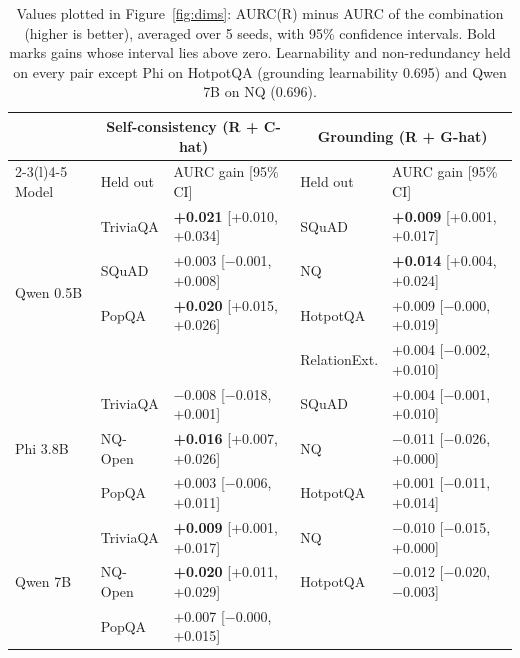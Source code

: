 \documentclass[10pt]{article}
\begin{document}
\begin{table}[h]
\centering
\small
\begin{tabular}{@{}lllll@{}}
\toprule
 & \multicolumn{2}{c}{Self-consistency (R + C-hat)} & \multicolumn{2}{c}{Grounding (R + G-hat)} \\
\cmidrule(lr){2-3}\cmidrule(l){4-5}
Model & Held out & AURC gain [95\% CI] & Held out & AURC gain [95\% CI] \\
\midrule
\multirow{4}{*}{Qwen 0.5B} & TriviaQA & \textbf{+0.021} [+0.010, +0.034] & SQuAD & \textbf{+0.009} [+0.001, +0.017] \\
 & SQuAD & +0.003 [$-$0.001, +0.008] & NQ & \textbf{+0.014} [+0.004, +0.024] \\
 & PopQA & \textbf{+0.020} [+0.015, +0.026] & HotpotQA & +0.009 [$-$0.000, +0.019] \\
 & & & RelationExt. & +0.004 [$-$0.002, +0.010] \\
\midrule
\multirow{3}{*}{Phi 3.8B} & TriviaQA & $-$0.008 [$-$0.018, +0.001] & SQuAD & +0.004 [$-$0.001, +0.010] \\
 & NQ-Open & \textbf{+0.016} [+0.007, +0.026] & NQ & $-$0.011 [$-$0.026, +0.000] \\
 & PopQA & +0.003 [$-$0.006, +0.011] & HotpotQA & +0.001 [$-$0.011, +0.014] \\
\midrule
\multirow{3}{*}{Qwen 7B} & TriviaQA & \textbf{+0.009} [+0.001, +0.017] & NQ & $-$0.010 [$-$0.015, +0.000] \\
 & NQ-Open & \textbf{+0.020} [+0.011, +0.029] & HotpotQA & $-$0.012 [$-$0.020, $-$0.003] \\
 & PopQA & +0.007 [$-$0.000, +0.015] & & \\
\bottomrule
\end{tabular}
\caption{Values plotted in Figure~\ref{fig:dims}: AURC(R) minus AURC of the combination (higher is better), averaged over 5 seeds, with 95\% confidence intervals. Bold marks gains whose interval lies above zero. Learnability and non-redundancy held on every pair except Phi on HotpotQA (grounding learnability 0.695) and Qwen 7B on NQ (0.696).}
\label{tab:dims}
\end{table}
\end{document}
